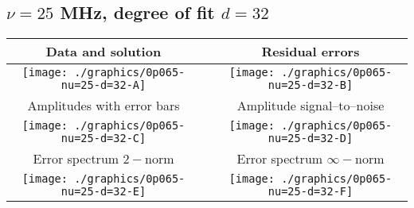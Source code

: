 

% 

\clearpage{}
\break{}

\subsection{$\nu = 25$ MHz, degree of fit $d = 32$}

\begin{table}[h]
    \begin{center}
        \begin{tabular}{ccc}
            Data and solution & \quad & Residual errors \\\hline
            \texttt{[image: ./graphics/0p065-nu=25-d=32-A]} &&
            \texttt{[image: ./graphics/0p065-nu=25-d=32-B]} \\[15pt]
            Amplitudes with error bars && Amplitude signal--to--noise \\\hline
            \texttt{[image: ./graphics/0p065-nu=25-d=32-C]} &&
            \texttt{[image: ./graphics/0p065-nu=25-d=32-D]} \\[15pt]
            Error spectrum $2-$norm && Error spectrum $\infty-$norm \\\hline
            \texttt{[image: ./graphics/0p065-nu=25-d=32-E]} &&
            \texttt{[image: ./graphics/0p065-nu=25-d=32-F]} \\[15pt]
        \end{tabular}
    \end{center}
\label{fig:elev=65, nu=25}
\end{table}



\endinput
